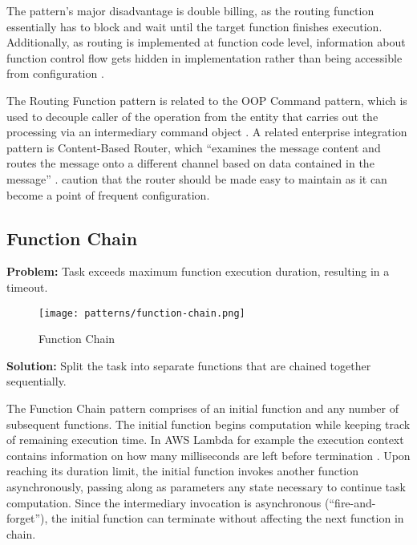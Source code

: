 The pattern's major disadvantage is double billing, as the routing function essentially has to block and wait until the target function finishes execution. Additionally, as routing is implemented at function code level, information about function control flow gets hidden in implementation rather than being accessible from configuration \parencite{leitner18industrialpractice}.

The Routing Function pattern is related to the OOP Command pattern, which is used to decouple caller of the operation from the entity that carries out the processing via an intermediary command object \parencite{gamma94designPatterns}. A related enterprise integration pattern is Content-Based Router, which ``examines the message content and routes the message onto a different channel based on data contained in the message'' \parencite{hohpe2004enterprise}. \textcite{hohpe2004enterprise} caution that the router should be made easy to maintain as it can become a point of frequent configuration.

\subsection{Function Chain} \label{subsec:functionChain}

\textbf{Problem:} Task exceeds maximum function execution duration, resulting in a timeout.

\begin{figure}[h]
  \centering
  \texttt{[image: patterns/function-chain.png]}
  \caption{Function Chain}
  \label{fig:patternFunctionChain}
\end{figure}

\textbf{Solution:} Split the task into separate functions that are chained together sequentially.

The Function Chain pattern comprises of an initial function and any number of subsequent functions. The initial function begins computation while keeping track of remaining execution time. In AWS Lambda for example the execution context contains information on how many milliseconds are left before termination \parencite{awslambda0218}. Upon reaching its duration limit, the initial function invokes another function asynchronously, passing along as parameters any state necessary to continue task computation. Since the intermediary invocation is asynchronous (``fire-and-forget''), the initial function can terminate without affecting the next function in chain.

